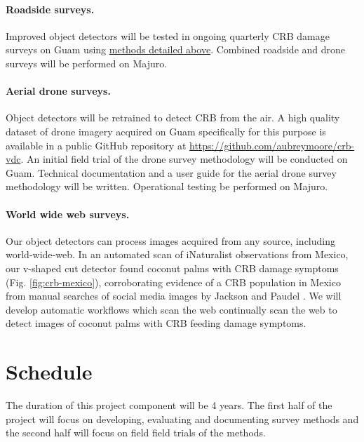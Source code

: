 \documentclass[11pt,english,letterpaper]{scrartcl}
\begin{document}
\paragraph{Roadside surveys.} Improved object detectors will be tested in ongoing quarterly CRB damage surveys on Guam using \hyperref[previous_work]{methods detailed above}. Combined roadside and drone surveys will be performed on Majuro. 

\paragraph{Aerial drone surveys.} Object detectors will be retrained to detect CRB from the air. A high quality dataset of drone imagery acquired on Guam specifically for this purpose is available in a public GitHub repository at \url{https://github.com/aubreymoore/crb-vdc}. An initial field trial of the drone survey methodology will be conducted on Guam. Technical documentation and a user guide for the aerial drone survey methodology will be written. Operational testing be performed on Majuro.

\paragraph{World wide web surveys.}

Our object detectors can process images acquired from any source, including world-wide-web. In an automated scan of iNaturalist observations from Mexico, our v-shaped cut detector found coconut palms with CRB damage symptoms (Fig. \ref{fig:crb-mexico}), corroborating evidence of a CRB population in Mexico from manual searches of social media images by Jackson and Paudel \cite{Jackson2022}. We will develop automatic workflows which scan the web continually scan the web to detect images of coconut palms with CRB feeding damage symptoms.

\section{Schedule}


The duration of this project component will be 4 years. The first half of the project will focus on developing, evaluating and documenting survey methods and the second half will focus on field field trials of the methods.
\end{document}
